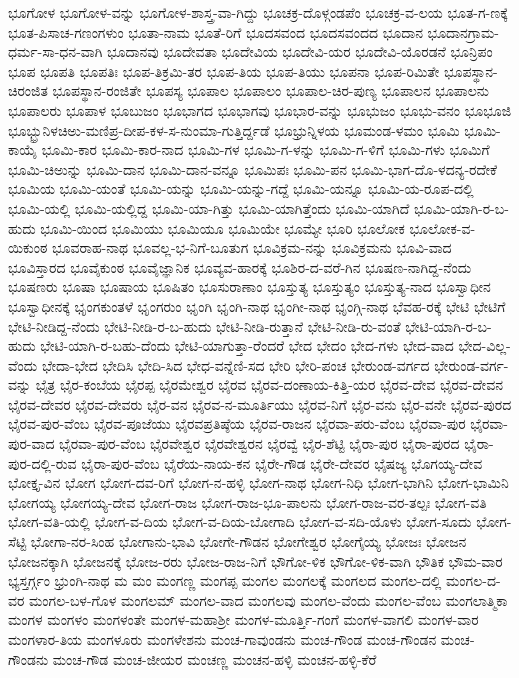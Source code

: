 ಭೂಗೋಳ
ಭೂಗೋಳ-ವನ್ನು
ಭೂಗೋಳ-ಶಾಸ್ತ್ರ-ವಾ-ಗಿದ್ದು
ಭೂಚಕ್ರ-ದೊಳ್ಗಂಡಪೆಂ
ಭೂಚಕ್ರ-ವ-ಲಯ
ಭೂತ-ಗ-ಣಕ್ಕೆ
ಭೂತ-ಪಿಸಾಚ-ಗಣಂಗಳುಂ
ಭೂತಾ-ನಾಮ
ಭೂತೆ-ರಿಗೆ
ಭೂದಸವಂದ
ಭೂದಸವಂದದ
ಭೂದಾನ
ಭೂದಾನಗ್ರಾಮ-ಧರ್ಮ-ಸಾ-ಧನ-ವಾಗಿ
ಭೂದಾನವು
ಭೂದೇವತಾ
ಭೂದೇವಿಯ
ಭೂದೇವಿ-ಯರ
ಭೂದೇವಿ-ಯೊರಡನೆ
ಭೂನ್ರಿಪಂ
ಭೂಪ
ಭೂಪತಿ
ಭೂಪತಿಃ
ಭೂಪ-ತಿಕ್ರಮಿ-ತರ
ಭೂಪ-ತಿಯ
ಭೂಪ-ತಿಯು
ಭೂಪನಾ
ಭೂಪ-ರಿಮಿತೇ
ಭೂಪಸ್ಥಾನ-ಚಿರಂಜಿತ
ಭೂಪಸ್ಥಾನ-ರಂಜಿತೇ
ಭೂಪಸ್ಯ
ಭೂಪಾಲ
ಭೂಪಾಲಂ
ಭೂಪಾಲ-ಚಿರ-ಪುಣ್ಯ
ಭೂಪಾಲನ
ಭೂಪಾಲನು
ಭೂಪಾಲರು
ಭೂಪಾಳ
ಭೂಬುಜಂ
ಭೂಭಾಗದ
ಭೂಭಾಗವು
ಭೂಭಾರ-ವನ್ನು
ಭೂಭುಜಂ
ಭೂಭು-ವನಂ
ಭೂಭೂಜಿ
ಭೂಭ್ಭ್ರುನಿಳಚಿಅು-ಮಣಿಪ್ರ-ದೀಪ-ಕಳ-ಸ-ನುಂಮಾ-ಗುತ್ತಿರ್ದ್ದಡೆ
ಭೂಭ್ರುನ್ನಿಳಯ
ಭೂಮಂಡ-ಳಮಂ
ಭೂಮಿ
ಭೂಮಿ-ಕಾಯೈ
ಭೂಮಿ-ಕಾರ
ಭೂಮಿ-ಕಾರ-ನಾದ
ಭೂಮಿ-ಗಳ
ಭೂಮಿ-ಗ-ಳನ್ನು
ಭೂಮಿ-ಗ-ಳಿಗೆ
ಭೂಮಿ-ಗಳು
ಭೂಮಿಗೆ
ಭೂಮಿ-ಚಿಅುನ್ನು
ಭೂಮಿ-ದಾನ
ಭೂಮಿ-ದಾನ-ವನ್ನೂ
ಭೂಮಿಪಃ
ಭೂಮಿ-ಪನ
ಭೂಮಿ-ಭಾಗ-ದೊ-ಳದನ್ಯ-ರದೇಕೆ
ಭೂಮಿಯ
ಭೂಮಿ-ಯಂತೆ
ಭೂಮಿ-ಯನ್ನು
ಭೂಮಿ-ಯನ್ನು-ಗದ್ದೆ
ಭೂಮಿ-ಯನ್ನೂ
ಭೂಮಿ-ಯ-ರೂಪ-ದಲ್ಲಿ
ಭೂಮಿ-ಯಲ್ಲಿ
ಭೂಮಿ-ಯಲ್ಲಿದ್ದ
ಭೂಮಿ-ಯಾ-ಗಿತ್ತು
ಭೂಮಿ-ಯಾಗಿತ್ತೆಂದು
ಭೂಮಿ-ಯಾಗಿದೆ
ಭೂಮಿ-ಯಾಗಿ-ರ-ಬ-ಹುದು
ಭೂಮಿ-ಯಿಂದ
ಭೂಮಿಯು
ಭೂಮಿಯೂ
ಭೂಮಿಯೇ
ಭೂಮ್ಯೇ
ಭೂರಿ
ಭೂಲೋಕ
ಭೂಲೋಕ-ವ-ಯಿಕುಂಠ
ಭೂವರಾಹ-ನಾಥ
ಭೂವಲ್ಲ-ಭ-ನಿಗೆ-ಬೂತುಗ
ಭೂವಿಕ್ರಮ-ನನ್ನು
ಭೂವಿಕ್ರಮನು
ಭೂವಿ-ವಾದ
ಭೂವಿಸ್ತಾರದ
ಭೂವೈಕುಂಠ
ಭೂವೈಜ್ಞಾನಿಕ
ಭೂವ್ಯವ-ಹಾರಕ್ಕೆ
ಭೂಶಿರ-ದ-ವರೆ-ಗಿನ
ಭೂಷಣ-ನಾಗಿದ್ದ-ನೆಂದು
ಭೂಷಣರು
ಭೂಷಾ
ಭೂಷಾಯ
ಭೂಷಿತಂ
ಭೂಸುರಾಣಾಂ
ಭೂಸ್ತುತ್ಯ
ಭೂಸ್ತುತ್ಯಂ
ಭೂಸ್ತುತ್ಯ-ನಾದ
ಭೂಸ್ವಾಧೀನ
ಭೂಸ್ವಾಧೀನಕ್ಕೆ
ಭೃಂಗಕುಂತಳೆ
ಭೃಂಗರುಂ
ಭೃಂಗಿ
ಭೃಂಗಿ-ನಾಥ
ಭೃಂಗೀ-ನಾಥ
ಭೃಂಗ್ಗಿ-ನಾಥ
ಭೆವಹ-ರಕ್ಕೆ
ಭೇಟಿ
ಭೇಟಿಗೆ
ಭೇಟಿ-ನೀಡಿದ್ದ-ನೆಂದು
ಭೇಟಿ-ನೀಡಿ-ರ-ಬ-ಹುದು
ಭೇಟಿ-ನೀಡಿ-ರುತ್ತಾನೆ
ಭೇಟಿ-ನೀಡಿ-ರು-ವಂತೆ
ಭೇಟಿ-ಯಾಗಿ-ರ-ಬ-ಹುದು
ಭೇಟಿ-ಯಾಗಿ-ರ-ಬಹು-ದೆಂದು
ಭೇಟಿ-ಯಾಗುತ್ತಾ-ರೆಂದರೆ
ಭೇದ
ಭೇದಂ
ಭೇದ-ಗಳು
ಭೇದ-ವಾದ
ಭೇದ-ವಿಲ್ಲ-ವೆಂದು
ಭೇದಾ-ಭೇದ
ಭೇದಿಸಿ
ಭೇದಿ-ಸಿದ
ಭೇಧ-ವನ್ನೆಣಿ-ಸದ
ಭೇರಿ
ಭೇರಿ-ಪಂಚ
ಭೇರುಂಡ-ವರ್ಗದ
ಭೇರುಂಡ-ವರ್ಗ-ವನ್ನು
ಭೈತ್ರ
ಭೈರ-ಕಂಬೆಯ
ಭೈರಪ್ಪ
ಭೈರಮೇಶ್ವರ
ಭೈರವ
ಭೈರವ-ದಂಣಾಯ-ಕಿತ್ತಿ-ಯರ
ಭೈರವ-ದೇವ
ಭೈರವ-ದೇವನ
ಭೈರವ-ದೇವರ
ಭೈರವ-ದೇವರು
ಭೈರ-ವನ
ಭೈರವ-ನ-ಮೂರ್ತಿಯು
ಭೈರವ-ನಿಗೆ
ಭೈರ-ವನು
ಭೈರ-ವನೇ
ಭೈರವ-ಪುರದ
ಭೈರವ-ಪುರ-ವೆಂಬ
ಭೈರವ-ಪೂಜೆಯು
ಭೈರವಪ್ರತಿಷ್ಠೆಯ
ಭೈರವ-ರಾಜನ
ಭೈರವಾ-ಪರು-ವೆಂಬ
ಭೈರವಾ-ಪುರ
ಭೈರವಾ-ಪುರ-ವಾದ
ಭೈರವಾ-ಪುರ-ವೆಂಬ
ಭೈರವೇಶ್ವರ
ಭೈರವೇಶ್ವರನ
ಭೈರವ್ವೆ
ಭೈರ-ಶೆಟ್ಟಿ
ಭೈರಾ-ಪುರ
ಭೈರಾ-ಪುರದ
ಭೈರಾ-ಪುರ-ದಲ್ಲಿ-ರುವ
ಭೈರಾ-ಪುರ-ವೆಂಬ
ಭೈರೆಯ-ನಾಯ-ಕನ
ಭೈರೇ-ಗೌಡ
ಭೈರೇ-ದೇವರ
ಭೈಷಜ್ಯ
ಭೊಗಯ್ಯ-ದೇವ
ಭೋಕ್ತೃ-ವಿನ
ಭೋಗ
ಭೋಗ-ದವ-ರಿಗೆ
ಭೋಗ-ನ-ಹಳ್ಳಿ
ಭೋಗ-ನಾಥ
ಭೋಗ-ನಿಧಿ
ಭೋಗ-ಭಾಗಿನಿ
ಭೋಗ-ಭಾಮಿನಿ
ಭೋಗಯ್ಯ
ಭೋಗಯ್ಯ-ದೇವ
ಭೋಗ-ರಾಜ
ಭೋಗ-ರಾಜ-ಭೂ-ಪಾಲನು
ಭೋಗ-ರಾಜ-ವರ-ತಲ್ಪಃ
ಭೋಗ-ವತಿ
ಭೋಗ-ವತಿ-ಯಲ್ಲಿ
ಭೋಗ-ವ-ದಿಯ
ಭೋಗ-ವ-ದಿಯ-ಬೋಗಾದಿ
ಭೋಗ-ವ-ಸದಿ-ಯೊಳು
ಭೋಗ-ಸೂದು
ಭೋಗ-ಸೆಟ್ಟಿ
ಭೋಗಾ-ನರ-ಸಿಂಹ
ಭೋಗಾನು-ಭಾವಿ
ಭೋಗೇ-ಗೌಡನ
ಭೋಗೇಶ್ವರ
ಭೋಗೈಯ್ಯ
ಭೋಜಃ
ಭೋಜನ
ಭೋಜನಕ್ಕಾಗಿ
ಭೋಜನಕ್ಕೆ
ಭೋಜ-ರರು
ಭೋಜ-ರಾಜ-ನಿಗೆ
ಭೌಗೋ-ಳಿಕ
ಭೌಗೋ-ಳಿಕ-ವಾಗಿ
ಭೌತಿಕ
ಭೌಮ-ವಾರ
ಭ್ಯಸ್ತರ್ಗ್ಗಂ
ಭ್ರುಂಗಿ-ನಾಥ
ಮ
ಮಂ
ಮಂಗಣ್ಣ
ಮಂಗಪ್ಪ
ಮಂಗಲ
ಮಂಗಲಕ್ಕೆ
ಮಂಗಲದ
ಮಂಗಲ-ದಲ್ಲಿ
ಮಂಗಲ-ದ-ವರ
ಮಂಗಲ-ಬಳ-ಗೊಳ
ಮಂಗಲಮ್
ಮಂಗಲ-ವಾದ
ಮಂಗಲವು
ಮಂಗಲ-ವೆಂದು
ಮಂಗಲ-ವೆಂಬ
ಮಂಗಲಾತ್ಮಿಕಾ
ಮಂಗಳ
ಮಂಗಳಂ
ಮಂಗಳಂತೇ
ಮಂಗಳ-ಮಹಾಶ್ರೀ
ಮಂಗಳ-ಮೂರ್ತ್ತಿ-ಗಂಗೆ
ಮಂಗಳ-ವಾಗಲಿ
ಮಂಗಳ-ವಾರ
ಮಂಗಳಾರ-ತಿಯ
ಮಂಗಳೂರು
ಮಂಗಳೇಶನು
ಮಂಚ-ಗಾವುಂಡನು
ಮಂಚ-ಗೌಂಡ
ಮಂಚ-ಗೌಂಡನ
ಮಂಚ-ಗೌಂಡನು
ಮಂಚ-ಗೌಡ
ಮಂಚ-ಜೀಯರ
ಮಂಚಣ್ಣ
ಮಂಚನ-ಹಳ್ಳಿ
ಮಂಚನ-ಹಳ್ಳಿ-ಕೆರೆ
